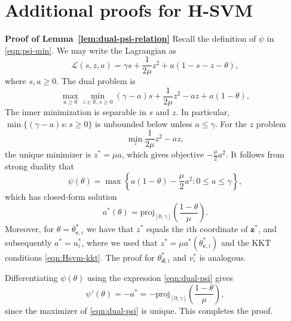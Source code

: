 \documentclass[twoside,11pt]{article}
\newcommand\proj{\mathrm{proj}}
\renewcommand{\c}{\bm{c}}
\renewcommand{\d}{\bm{d}}
\newcommand{\R}{{\mathbb{R}}} %
\newcommand\z{\bm{z}}
\newcommand\mL{\mathcal{L}}
\newenvironment{proofof}[1]
  {\par\noindent\textbf{Proof of #1}\enspace\ignorespaces}
  {\hfill\BlackBox\\[2mm]}
\begin{document}
\section{Additional proofs for H-SVM} \label{app:Hsvm-theory}
\begin{proofof}{Lemma~\ref{lem:dual-psi-relation}}
    Recall the definition of $\psi$ in \eqref{eqn:psi-min}. We may write the Lagrangian as
    \[
        \mL(s,z,a) = \gamma s + \frac{1}{2\mu}z^2 + a(1-s-z-\theta),
    \]
    where $s,a\geq 0$. The dual problem is
    \[
        \max_{a\geq 0}\min_{z\in\R,s\geq 0} (\gamma - a)s + \frac{1}{2\mu}z^2 - az + a(1-\theta),
    \]
    The inner minimization is separable in $s$ and $z$. In particular, $\min \{(\gamma - a)s : s \geq 0\}$ is unbounded below unless $a \leq \gamma$. For the $z$ problem
    \[
        \min_z \frac{1}{2\mu}z^2 - az,
    \]
    the unique minimizer is $z^* = \mu a$, which gives objective $-\frac{\mu}{2}a^2$. It follows from strong duality that
    \begin{equation} \label{eqn:dual-psi}
        \psi(\theta) = \max \left\{ a(1-\theta) - \frac{\mu}{2}a^2 : 0 \leq a \leq \gamma\right\},
    \end{equation}
    which has closed-form solution
    \[
        a^*(\theta) = \proj_{[0,\gamma]}\left(\frac{1-\theta}{\mu}\right).
    \]
    Moreover, for $\theta = \theta^*_{\c,i}$ we have that $z^*$ equals the $i$th coordinate of $\z^*$, and subsequently $a^* = u_i^*$, where we used that $z^* = \mu a^*(\theta^*_{\c,i})$ and the KKT conditions \eqref{eqn:Hsvm-kkt}. The proof for $\theta^*_{\d,i}$ and $v_i^*$ is analogous.

    Differentiating $\psi(\theta)$ using the expression \eqref{eqn:dual-psi} gives
    \[
        \psi'(\theta) = -a^* = -\proj_{[0,\gamma]}\left(\frac{1-\theta}{\mu}\right),
    \]
    since the maximizer of \eqref{eqn:dual-psi} is unique. This completes the proof.
\end{proofof}
\end{document}
